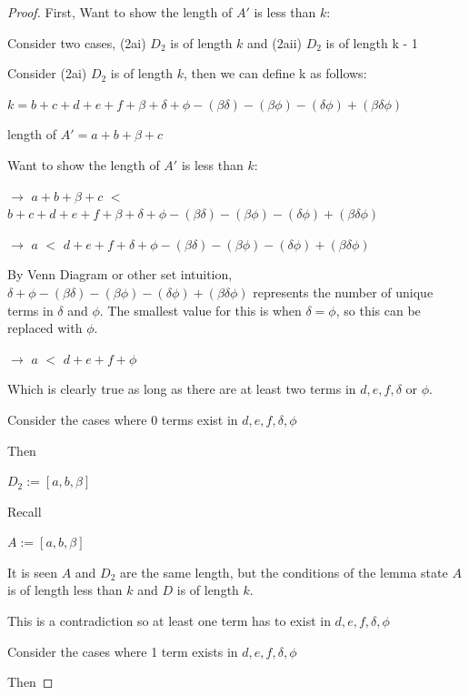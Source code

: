 \documentclass[manuscript]{acmart}
\begin{document}
\begin{proof}
        First, Want to show the length of $A'$ is less than $k$:

        Consider two cases, (2ai) $D_2$ is of length $k$ and 
        (2aii) $D_2$ is of length k - 1

        Consider (2ai) $D_2$ is of length $k$, then we can define k as follows:

        $k = b + c + d + e + f + \beta + \delta + \phi - (\beta \delta) 
        - (\beta \phi) - (\delta \phi) + (\beta \delta \phi)$

        length of $A' = a + b + \beta + c$

        Want to show the length of $A'$ is less than $k$:

        $\rightarrow$ $a + b + \beta + c$ $<$ $b + c + d + e + f + 
        \beta + \delta + \phi - (\beta \delta) 
        - (\beta \phi) - (\delta \phi) + (\beta \delta \phi)$

        $\rightarrow$ $a$ $<$ $d + e + f + \delta + \phi - (\beta \delta) 
        - (\beta \phi) - (\delta \phi) + (\beta \delta \phi)$

        By Venn Diagram or other set intuition, 
        $\delta + \phi - (\beta \delta) - (\beta \phi) - (\delta \phi) + 
        (\beta \delta \phi)$ represents the number of unique terms in 
        $\delta$ and $\phi$.
        The smallest value for this is when $\delta = \phi$, so this can
        be replaced with $\phi$.

        $\rightarrow$ $a$ $<$ $d + e + f + \phi$

        Which is clearly true as long as there are at least two terms in $d, e, f, \delta$ or $\phi$.

        Consider the cases where 0 terms exist in $d, e, f, \delta, \phi$

        Then 
        
        $D_2 := [a, b, \beta]$

        Recall 

        $A := [a, b, \beta]$

        It is seen $A$ and $D_2$ are the same length, but the conditions of the lemma state
        $A$ is of length less than $k$ and $D$ is of length $k$. 

        This is a contradiction so at least one term has to exist in $d, e, f, \delta, \phi$

        Consider the cases where 1 term exists in $d, e, f, \delta, \phi$

        Then 
        

\end{proof}
\end{document}
